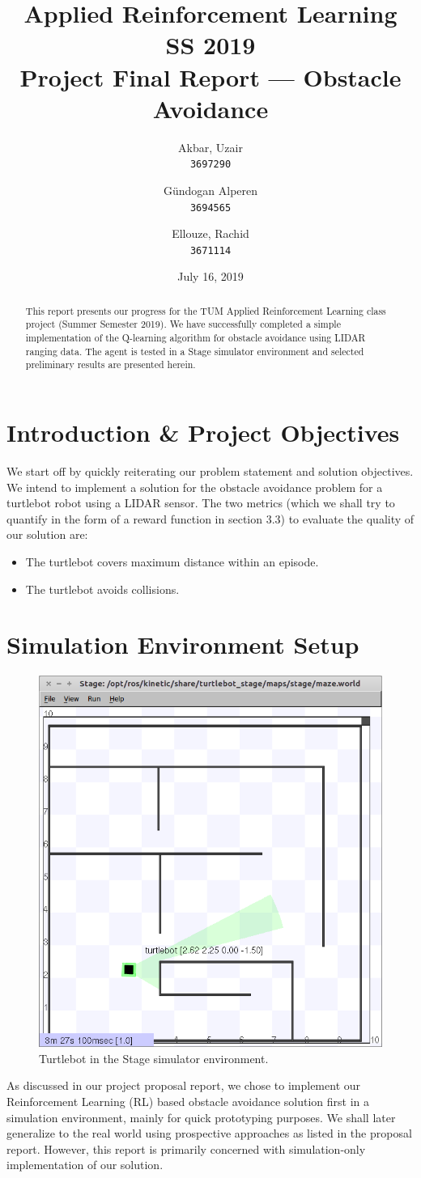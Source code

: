 \documentclass{article}
\title{Applied Reinforcement Learning\\
        \vspace{-0.25cm}
        {\large SS 2019}\\
        \vspace{0.25cm}
        {Project Final Report --- Obstacle Avoidance}}
\author{
  \small Akbar, Uzair\\
  \small \texttt{3697290}
  \and
  \small G\"undogan Alperen\\
  \small \texttt{3694565}
  \and
  \small Ellouze, Rachid \\
  \small \texttt{3671114}
}
\date{July 16, 2019}
\begin{document}
\begin{titlingpage}
    \maketitle
    \begin{abstract}
This report presents our progress for the TUM Applied Reinforcement Learning class project (Summer Semester 2019). We have successfully completed a simple implementation of the Q-learning algorithm for obstacle avoidance using LIDAR ranging data. The agent is tested in a Stage simulator environment and selected preliminary results are presented herein.
    \end{abstract}
    \tableofcontents
\end{titlingpage}

\section{Introduction \& Project Objectives}
We start off by quickly reiterating our problem statement and solution objectives. We intend to implement a solution for the obstacle avoidance problem for a turtlebot robot using a LIDAR sensor. The two metrics (which we shall try to quantify in the form of a reward function in section 3.3) to evaluate the quality of our solution are:
\begin{itemize}
\item The turtlebot covers maximum distance within an episode.
\item The turtlebot avoids collisions.
\end{itemize}

\section{Simulation Environment Setup}
\begin{figure}[ht]
 \centering
 \includegraphics[width=.33\textwidth]{stageSim.png}
  \caption{Turtlebot in the Stage simulator environment.}
  \label{fig:stage}
\end{figure}
As discussed in our project proposal report, we chose to implement our Reinforcement Learning (RL) based obstacle avoidance solution first in a simulation environment, mainly for quick prototyping purposes. We shall later generalize to the real world using prospective approaches as listed in the proposal report. However, this report is primarily concerned with simulation-only implementation of our solution.
\end{document}
